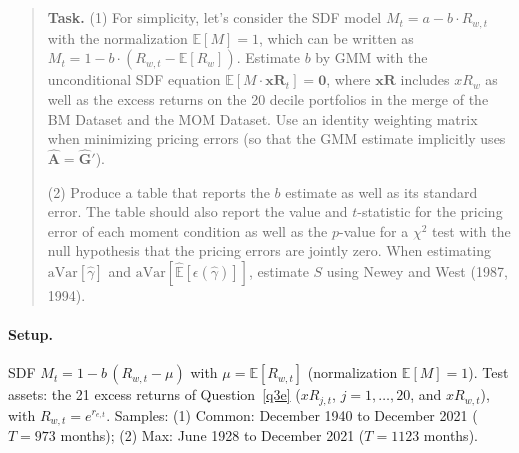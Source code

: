 \documentclass[11pt]{article}
\newcommand{\task}[1]{\begin{quote}\small\textbf{Task.} #1\end{quote}}
\begin{document}
\FloatBarrier
\subsection{}\label{q4b}
\task{(1) For simplicity, let's consider the SDF model $M_t = a - b \cdot R_{w,t}$ with the normalization $\mathbb{E}[M] = 1$, which can be written as $M_t = 1 - b \cdot (R_{w,t} - \mathbb{E}[R_w])$. Estimate $b$ by GMM with the unconditional SDF equation $\mathbb{E}[M \cdot \mathbf{xR}_t] = \mathbf{0}$, where $\mathbf{xR}$ includes $xR_w$ as well as the excess returns on the 20 decile portfolios in the merge of the BM Dataset and the MOM Dataset. Use an identity weighting matrix when minimizing pricing errors (so that the GMM estimate implicitly uses $\hat{\mathbf{A}} = \hat{\mathbf{G}}'$).\par (2) Produce a table that reports the $b$ estimate as well as its standard error. The table should also report the value and $t$-statistic for the pricing error of each moment condition as well as the $p$-value for a $\chi^2$ test with the null hypothesis that the pricing errors are jointly zero. When estimating $\mathrm{aVar}[\hat{\gamma}]$ and $\mathrm{aVar}[\widehat{\mathbb{E}}[\epsilon(\hat{\gamma})]]$, estimate $S$ using Newey and West (1987, 1994).}
\paragraph{Setup.}
SDF $M_t = 1 - b\,(R_{w,t} - \mu)$ with $\mu = \mathbb{E}[R_{w,t}]$ (normalization $\mathbb{E}[M] = 1$).
Test assets: the 21 excess returns of Question~\ref{q3e} ($xR_{j,t}$, $j = 1, \dots, 20$, and $xR_{w,t}$),
with $R_{w,t} = e^{r_{e,t}}$. Samples: (1) Common: December 1940 to December 2021 ($T = 973$ months); (2) Max: June 1928 to December 2021 ($T = 1123$ months).
\end{document}
